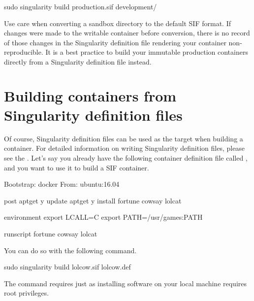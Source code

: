\documentclass[letterpaper,10pt,english]{sphinxmanual}
\begin{document}
%
\begin{sphinxVerbatim}[commandchars=\\\{\}]
\PYGZdl{} sudo singularity build production.sif development/
\end{sphinxVerbatim}

Use care when converting a sandbox directory to the default SIF format. If
changes were made to the writable container before conversion, there is no
record of those changes in the Singularity definition file rendering your
container non-reproducible. It is a best practice to build your immutable
production containers directly from a Singularity definition file instead.


\section{Building containers from Singularity definition files}
\label{\detokenize{build_a_container:building-containers-from-singularity-definition-files}}
Of course, Singularity definition files can be used as the target when building
a container. For detailed information on writing Singularity definition files,
please see the . Let’s say
you already have the following container definition file called ,
and you want to use it to build a SIF container.

%
\begin{sphinxVerbatim}[commandchars=\\\{\}]
Bootstrap: docker
From: ubuntu:16.04

\PYGZpc{}post
    apt\PYGZhy{}get \PYGZhy{}y update
    apt\PYGZhy{}get \PYGZhy{}y install fortune cowsay lolcat

\PYGZpc{}environment
    export LC\PYGZus{}ALL=C
    export PATH=/usr/games:\PYGZdl{}PATH

\PYGZpc{}runscript
    fortune \textbar{} cowsay \textbar{} lolcat
\end{sphinxVerbatim}

You can do so with the following command.

%
\begin{sphinxVerbatim}[commandchars=\\\{\}]
\PYGZdl{} sudo singularity build lolcow.sif lolcow.def
\end{sphinxVerbatim}

The command requires  just as installing software on your local machine
requires root privileges.
\end{document}
